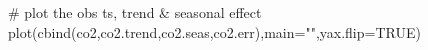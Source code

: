 \begin{Schunk}
\begin{Sinput}
 # plot the obs ts, trend & seasonal effect
 plot(cbind(co2,co2.trend,co2.seas,co2.err),main="",yax.flip=TRUE)
\end{Sinput}
\end{Schunk}
